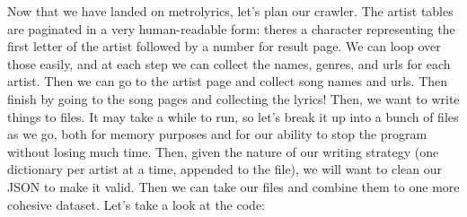\documentclass[11pt, twoside, reqno]{book}
\begin{document}
Now that we have landed on metrolyrics, let's plan our crawler. The artist tables are paginated in a very human-readable form: theres a character representing the first letter of the artist followed by a number for result page. We can loop over those easily, and at each step we can collect the names, genres, and urls for each artist. Then we can go to the artist page and collect song names and urls. Then finish by going to the song pages and collecting the lyrics! Then, we want to write things to files. It may take a while to run, so let's break it up into a bunch of files as we go, both for memory purposes and for our ability to stop the program without losing much time. Then, given the nature of our writing strategy (one dictionary per artist at a time, appended to the file), we will want to clean our JSON to make it valid. Then we can take our files and combine them to one more cohesive dataset. Let's take a look at the code:
\end{document}
